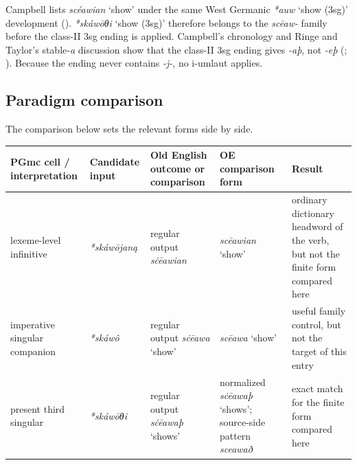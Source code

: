 \documentclass[
  british,
  a4paper,
  openany]{book}
\newcounter{none} %
\providecommand{\Recon}[1]{\emph{*#1}}
{\catcode`→=\active \global\def→{\ensuremath{\rightarrow}}}
\providecommand{\Recon}[1]{\emph{*#1}}
{\catcode`→=\active \global\def→{\ensuremath{\rightarrow}}}
\begin{document}
Campbell lists {\emph{scéawian}} `show' under the same West Germanic
\Recon{auw} `show (3sg)' development
().
{\Recon{skáwōθi} `show (3sg)'} therefore belongs to the \emph{scēaw-}
family before the class-II 3sg ending is applied. Campbell's chronology
and Ringe and Taylor's stable-\emph{a} discussion show that the class-II
3sg ending gives \emph{-aþ}, not \emph{-eþ}
(;
). Because the
ending never contains \emph{-j-}, no i-umlaut applies.

\subsection{Paradigm comparison}\label{paradigm-comparison-27}

The comparison below sets the relevant forms side by side.

{\def\LTcaptype{none} %
\begin{longtable}[]{@{}
  >{\raggedright\arraybackslash}p{}
  >{\raggedright\arraybackslash}p{}
  >{\raggedright\arraybackslash}p{}
  >{\raggedright\arraybackslash}p{}
  >{\raggedright\arraybackslash}p{}@{}}
\toprule\noalign{}
\begin{minipage}[b]{\linewidth}\raggedright
PGmc cell / interpretation
\end{minipage} & \begin{minipage}[b]{\linewidth}\raggedright
Candidate input
\end{minipage} & \begin{minipage}[b]{\linewidth}\raggedright
Old English outcome or comparison
\end{minipage} & \begin{minipage}[b]{\linewidth}\raggedright
OE comparison form
\end{minipage} & \begin{minipage}[b]{\linewidth}\raggedright
Result
\end{minipage} \\
\midrule\noalign{}
\endhead
\bottomrule\noalign{}
\endlastfoot
lexeme-level infinitive & {\emph{*skáwōjaną}} & regular output
{\emph{sċēawian}} & {\emph{scēawian}} `show' & ordinary dictionary
headword of the verb, but not the finite form compared here \\
imperative singular companion & {\emph{*skáwô}} & regular output
{\emph{sċēawa}} `show' & {\emph{scēawa}} `show' & useful family control,
but not the target of this entry \\
present third singular & {\emph{*skáwōθi}} & regular output
{\emph{sċēawaþ}} `shows' & normalized {\emph{sċēawaþ}} `shows';
source-side pattern \emph{sceawað} & exact match for the finite form
compared here \\
\end{longtable}
}
\end{document}
